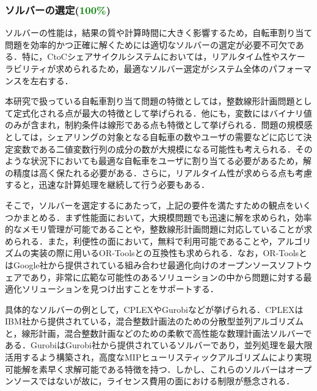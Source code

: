       \subsubsection{ソルバーの選定(\textcolor{green}{100\%})}
        \label{sec:ソルバーの選定}
          \par ソルバーの性能は，結果の質や計算時間に大きく影響するため，自転車割り当て問題を効率的かつ正確に解くためには適切なソルバーの選定が必要不可欠である．特に，CtoCシェアサイクルシステムにおいては，リアルタイム性やスケーラビリティが求められるため，最適なソルバー選定がシステム全体のパフォーマンスを左右する．
          
          \par 本研究で扱っている自転車割り当て問題の特徴としては，整数線形計画問題として定式化される点が最大の特徴として挙げられる．他にも，変数にはバイナリ値のみが含まれ，制約条件は線形である点も特徴として挙げられる．問題の規模感としては，シェアリングの対象となる自転車の数やユーザの需要などに応じて決定変数である二値変数行列の成分の数が大規模になる可能性も考えられる．そのような状況下においても最適な自転車をユーザに割り当てる必要があるため，解の精度は高く保たれる必要がある．さらに，リアルタイム性が求めらる点も考慮すると，迅速な計算処理を継続して行う必要もある．
          
          \par そこで，ソルバーを選定するにあたって，上記の要件を満たすための観点をいくつかまとめる．まず性能面において，大規模問題でも迅速に解を求められ，効率的なメモリ管理が可能であることや，整数線形計画問題に対応していることが求められる．また，利便性の面において，無料で利用可能であることや，アルゴリズムの実装の際に用いるOR-Toolsとの互換性も求められる．なお，OR-ToolsとはGoogle社から提供されている組み合わせ最適化向けのオープンソースソフトウェアであり，非常に広範な可能性のあるソリューションの中から問題に対する最適化ソリューションを見つけ出すことをサポートする．
          
          \par 具体的なソルバーの例として，CPLEXやGurobiなどが挙げられる．CPLEXはIBM社から提供されている，混合整数計画法のための分散型並列アルゴリズムと，線形計画，混合整数計画などのための柔軟で高性能な数理計画法ソルバーである．GurobiはGurobi社から提供されているソルバーであり，並列処理を最大限活用するよう構築され，高度なMIPヒューリスティックアルゴリズムにより実現可能解を素早く求解可能である特徴を持つ．しかし、これらのソルバーはオープンソースではないが故に，ライセンス費用の面における制限が懸念される．
          
